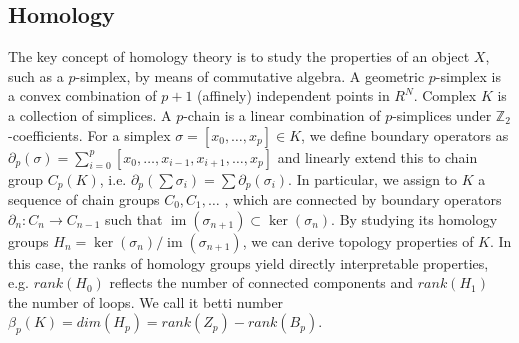 \documentclass[letterpaper]{article} %
\begin{document}
\subsection{Homology}
The key concept of homology theory is to study the properties of an object \(X\), such as a \(p\)-simplex, by means of commutative algebra. A geometric \(p\)-simplex is a convex combination of \(p+1\) (affinely) independent points in \(R^N\). Complex \(K\) is a collection of simplices. A \(p\)-chain is a linear combination of \(p\)-simplices under \(\mathbb{Z}_2\)-coefficients. For a simplex \(\sigma = [x_0, \dots, x_p] \in K\), we define boundary operators as \(\partial_p(\sigma) = \sum_{i=0}^{p}[x_0, \dots , x_{i - 1}, x_{i+1}, \dots , x_p]\) and linearly extend this to chain group \(C_p(K)\), i.e. \(\partial_p( \sum \sigma_i) = \sum \partial_p(\sigma_i)\). In particular, we assign to \(K\) a sequence of chain groups \(C_0, C_1, \dots\) , which are connected by boundary operators \(\partial_n : C_n  \rightarrow C_{n-1}\) such that \(\operatorname{im} (\sigma_{n+1}) \subset \operatorname{ker} (\sigma_n)\). By studying its homology groups \(H_n = \operatorname{ker} (\sigma_n)/\operatorname{im} (\sigma_{n+1})\), we can derive topology properties of \(K\). In this case, the ranks of homology groups yield directly interpretable properties, e.g. \(rank(H_0)\) reflects the number of connected components and \(rank(H_1)\) the number of loops. We call it betti number \(\beta_p(K)=dim(H_p) = rank(Z_p)-rank(B_p)\).


\end{document}
